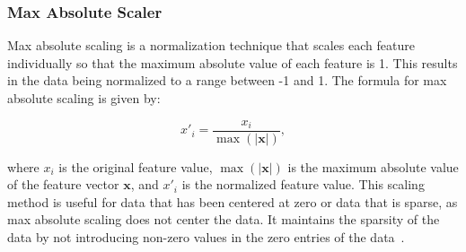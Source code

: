 \subsubsection{Max Absolute Scaler}
Max absolute scaling is a normalization technique that scales each feature individually so that the maximum absolute value of each feature is 1.
This results in the data being normalized to a range between -1 and 1.
The formula for max absolute scaling is given by:

$$
x'_i = \frac{x_i}{\max(|\mathbf{x}|)},
$$

where $x_i$ is the original feature value, $\max(|\mathbf{x}|)$ is the maximum absolute value of the feature vector $\mathbf{x}$, and $x'_i$ is the normalized feature value.
This scaling method is useful for data that has been centered at zero or data that is sparse, as max absolute scaling does not center the data.
It maintains the sparsity of the data by not introducing non-zero values in the zero entries of the data~\cite{Vasques2024}.